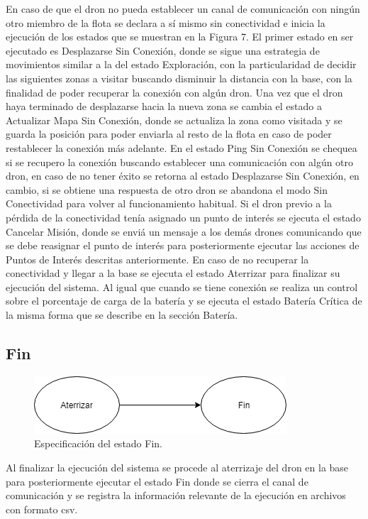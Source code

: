En caso de que el dron no pueda establecer un canal de comunicación con ningún otro miembro de la flota se declara a sí mismo sin conectividad e inicia la ejecución de los estados que se muestran en la Figura 7.
El primer estado en ser ejecutado es Desplazarse Sin Conexión, donde se sigue una estrategia de movimientos similar a la del estado Exploración, con la particularidad de decidir las siguientes zonas a visitar buscando disminuir la distancia con la base, con la finalidad de poder recuperar la conexión con algún dron.
Una vez que el dron haya terminado de desplazarse hacia la nueva zona se cambia el estado a Actualizar Mapa Sin Conexión, donde se actualiza la zona como visitada y se guarda la posición para poder enviarla al resto de la flota en caso de poder restablecer la conexión más adelante.
En el estado Ping Sin Conexión se chequea si se recupero la conexión buscando establecer una comunicación con algún otro dron, en caso de no tener éxito se retorna al estado Desplazarse Sin Conexión, en cambio, si se obtiene una respuesta de otro dron se abandona el modo Sin Conectividad  para volver al funcionamiento habitual.
Si el dron previo a la pérdida de la conectividad tenía asignado un punto de interés se ejecuta el estado Cancelar Misión, donde se enviá un mensaje a los demás drones comunicando que se debe reasignar el punto de interés para posteriormente ejecutar las acciones de Puntos de Interés descritas anteriormente.
En caso de no recuperar la conectividad y llegar a la base se ejecuta el estado Aterrizar para finalizar su ejecución del sistema.
Al igual que cuando se tiene conexión se realiza un control sobre el porcentaje de carga de la batería y se ejecuta el estado Batería Crítica de la misma forma que se describe en la sección Batería.
\subsection {Fin}


\begin{figure}[h!]
	\label{fig:comp}
	\includegraphics[width=.8\textwidth]{imagenes/chap5/image8}
	\caption{Especificación del estado Fin.}
\end{figure}


Al finalizar la ejecución del sistema se procede al aterrizaje del dron en la base para posteriormente ejecutar el estado Fin donde se cierra el canal de comunicación y se registra la información relevante de la ejecución en archivos con formato csv.
